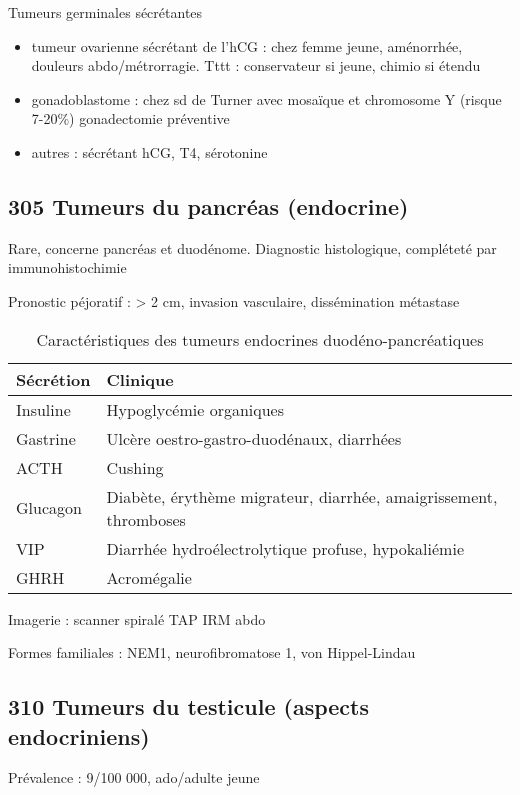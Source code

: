 \documentclass[11pt]{article}
\begin{document}
Tumeurs germinales sécrétantes
\begin{itemize}
\item tumeur ovarienne sécrétant de l'hCG : chez femme jeune, aménorrhée, douleurs
abdo/métrorragie. Tttt : conservateur si jeune, chimio si étendu
\item gonadoblastome : chez sd de Turner avec mosaïque et chromosome Y (risque
7-20\%) \thus gonadectomie préventive
\item autres : sécrétant hCG, T4, sérotonine
\end{itemize}

\subsection{305 \textdagger{} Tumeurs du pancréas (endocrine)}
\label{sec:orge95d03f}
Rare, concerne pancréas et duodénome. Diagnostic histologique, compléteté par
immunohistochimie

Pronostic péjoratif : > 2 cm, invasion vasculaire, dissémination métastase

\begin{table}[htbp]
\caption{Caractéristiques des tumeurs endocrines duodéno-pancréatiques}
\centering
\begin{tabular}{ll}
Sécrétion & Clinique\\
\hline
Insuline & Hypoglycémie organiques\\
Gastrine & Ulcère oestro-gastro-duodénaux, diarrhées\\
ACTH & Cushing\\
Glucagon & Diabète, érythème migrateur, diarrhée, amaigrissement, thromboses\\
VIP & Diarrhée hydroélectrolytique profuse, hypokaliémie\\
GHRH & Acromégalie\\
\end{tabular}
\end{table}

Imagerie : scanner spiralé TAP \textpm{} IRM abdo

Formes familiales : NEM1, neurofibromatose 1, von Hippel-Lindau

\subsection{310 \textdagger{} Tumeurs du testicule (aspects endocriniens)}
\label{sec:orga6c5484}

Prévalence : 9/100 000, ado/adulte jeune
\end{document}
